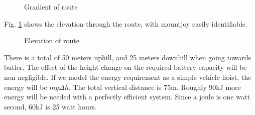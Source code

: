 \documentclass{article}
\begin{document}
\begin{figure}[H]
    \centering
    \caption{Gradient of route}
    \label{fig:route_el}
\end{figure}
Fig. \ref{fig:route_el} shows the elevation through the route, with mountjoy easily identifiable. 
\begin{figure}[H]
    \centering
    \caption{Elevation of route}
    \label{fig:route_grad}
\end{figure}
There is a total of 50 meters uphill, and 25 meters downhill when going towards butler.
The effect of the height change on the required battery capacity will be non negligible.
If we model the energy requirement as a simple vehicle hoist, the energy will be $mg\Delta h$.
The total vertical distance is 75m.
Roughly 90kJ more energy will be needed with a perfectly efficient system.
Since a joule is one watt second, 60kJ is 25 watt hours.
\end{document}
